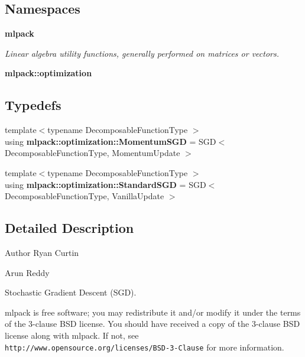 \subsection*{Namespaces}
\begin{DoxyCompactItemize}
\item 
 {\bf mlpack}
\begin{DoxyCompactList}\small\item\em Linear algebra utility functions, generally performed on matrices or vectors. \end{DoxyCompactList}\item 
 {\bf mlpack\+::optimization}
\end{DoxyCompactItemize}
\subsection*{Typedefs}
\begin{DoxyCompactItemize}
\item 
{\footnotesize template$<$typename Decomposable\+Function\+Type $>$ }\\using {\bf mlpack\+::optimization\+::\+Momentum\+S\+GD} = S\+GD$<$ Decomposable\+Function\+Type, Momentum\+Update $>$
\item 
{\footnotesize template$<$typename Decomposable\+Function\+Type $>$ }\\using {\bf mlpack\+::optimization\+::\+Standard\+S\+GD} = S\+GD$<$ Decomposable\+Function\+Type, Vanilla\+Update $>$
\end{DoxyCompactItemize}


\subsection{Detailed Description}
\begin{DoxyAuthor}{Author}
Ryan Curtin 

Arun Reddy
\end{DoxyAuthor}
Stochastic Gradient Descent (S\+GD).

mlpack is free software; you may redistribute it and/or modify it under the terms of the 3-\/clause B\+SD license. You should have received a copy of the 3-\/clause B\+SD license along with mlpack. If not, see {\tt http\+://www.\+opensource.\+org/licenses/\+B\+S\+D-\/3-\/\+Clause} for more information. 
